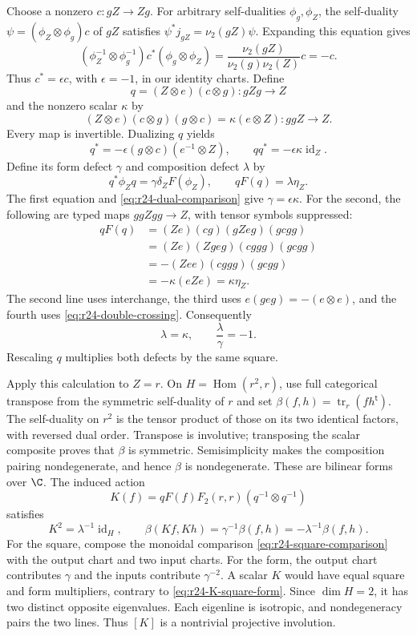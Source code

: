 Choose a nonzero $c:gZ\to Zg$. For arbitrary self-dualities
$\phi_g,\phi_Z$, the self-duality
$\psi=(\phi_Z\otimes\phi_g)c$ of $gZ$ satisfies
$\psi^*j_{gZ}=\nu_2(gZ)\psi$. Expanding this equation gives
\[
 (\phi_Z^{-1}\otimes\phi_g^{-1})c^*(\phi_g\otimes\phi_Z)
 =\frac{\nu_2(gZ)}{\nu_2(g)\nu_2(Z)}c=-c.
\]
Thus $c^*=\epsilon c$, with $\epsilon=-1$, in our identity charts.
Define
\[
 q=(Z\otimes e)(c\otimes g):gZg\to Z
\]
and the nonzero scalar $\kappa$ by
\begin{equation}\label{eq:r24-double-crossing}
 (Z\otimes e)(c\otimes g)(g\otimes c)
       =\kappa(e\otimes Z):ggZ\to Z.
\end{equation}
Every map is invertible. Dualizing $q$ yields
\[
 q^*=-\epsilon(g\otimes c)(e^{-1}\otimes Z),\qquad
 qq^*=-\epsilon\kappa\operatorname{id}_Z.
\]
Define its form defect $\gamma$ and composition defect $\lambda$ by
\[
 q^*\phi_Zq=\gamma\delta_ZF(\phi_Z),\qquad
 qF(q)=\lambda\eta_Z.
\]
The first equation and \eqref{eq:r24-dual-comparison} give
$\gamma=\epsilon\kappa$. For the second, the following are typed
maps $ggZgg\to Z$, with tensor symbols suppressed:
\begin{align*}
 qF(q)&=(Z e)(c g)(g Z e g)(g c g g)\\
      &=(Z e)(Z g e g)(c g g g)(g c g g)\\
      &=-(Z e e)(c g g g)(g c g g)\\
      &=-\kappa(e Z e)=\kappa\eta_Z.
\end{align*}
The second line uses interchange, the third uses
$e(g e g)=-(e\otimes e)$, and the fourth uses
\eqref{eq:r24-double-crossing}. Consequently
\begin{equation}\label{eq:r24-defect-ratio}
 \lambda=\kappa,\qquad \frac\lambda\gamma=-1.
\end{equation}
Rescaling $q$ multiplies both defects by the same square.

Apply this calculation to $Z=r$. On $H=\operatorname{Hom}(r^2,r)$,
use full categorical transpose from the symmetric self-duality of $r$
and set $\beta(f,h)=\operatorname{tr}_r(fh^{\mathsf t})$.
The self-duality on $r^2$ is the tensor product of those on its two
identical factors, with reversed dual order. Transpose is involutive;
transposing the scalar composite proves that $\beta$ is symmetric.
Semisimplicity makes the composition pairing nondegenerate, and hence
$\beta$ is nondegenerate. These are bilinear forms over $\C$.
The induced action
\[
 K(f)=qF(f)F_2(r,r)(q^{-1}\otimes q^{-1})
\]
satisfies
\begin{equation}\label{eq:r24-K-square-form}
 K^2=\lambda^{-1}\operatorname{id}_H,\qquad
 \beta(Kf,Kh)=\gamma^{-1}\beta(f,h)
             =-\lambda^{-1}\beta(f,h).
\end{equation}
For the square, compose the monoidal comparison \eqref{eq:r24-square-comparison}
with the output chart and two input charts. For the form, the output
chart contributes $\gamma$ and the inputs contribute $\gamma^{-2}$.
A scalar $K$ would have equal square and form multipliers, contrary to
\eqref{eq:r24-K-square-form}. Since $\dim H=2$, it has two distinct
opposite eigenvalues. Each eigenline is isotropic, and nondegeneracy
pairs the two lines. Thus $[K]$ is a nontrivial projective involution.

